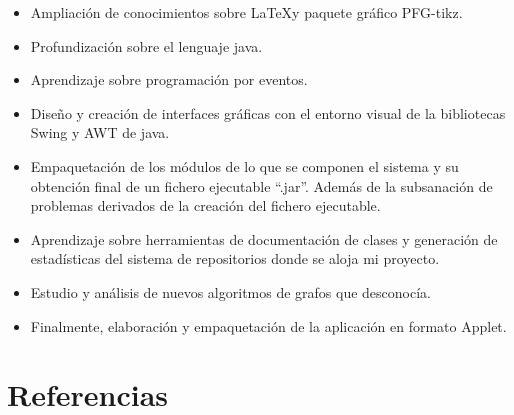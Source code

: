 \documentclass[xcolor=x11names,compress]{beamer}
\theoremstyle{cuadrado}
\begin{document}
{{\begin{itemize}
\item Ampliación de conocimientos sobre \LaTeX y paquete gráfico PFG-tikz.
\item Profundización sobre el lenguaje java.
\item Aprendizaje sobre programación por eventos.
\item Diseño y creación de interfaces gráficas con el entorno visual de la bibliotecas Swing y AWT de java.
\item Empaquetación de los módulos de lo que se componen el sistema y su obtención final de un fichero ejecutable ``.jar''. Además de la subsanación de problemas derivados de la creación del fichero ejecutable.
\item Aprendizaje sobre herramientas de documentación de clases y generación de estadísticas del sistema de repositorios donde se aloja mi proyecto.
\item Estudio y análisis de nuevos algoritmos de grafos que desconocía.
\item Finalmente, elaboración y empaquetación de la aplicación en formato Applet.
\end{itemize}

}


\section{Referencias}

\frame{\frametitle{\textcolor{black}{Referencias}}

}}
\end{document}
